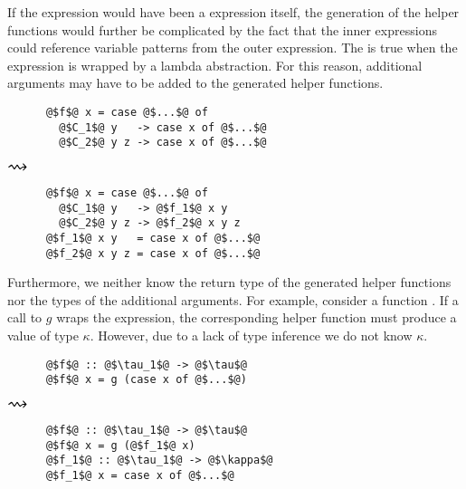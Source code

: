 If the  expression would have been a  expression itself, the generation of the helper functions would further be complicated by the fact that the inner  expressions could reference variable patterns from the outer  expression.
The is true when the  expression is wrapped by a lambda abstraction.
For this reason, additional arguments may have to be added to the generated helper functions.

\begin{center}
  \begin{minipage}[t]{0.3\textwidth}
    \begin{verbatim}
      @$f$@ x = case @$...$@ of
        @$C_1$@ y   -> case x of @$...$@
        @$C_2$@ y z -> case x of @$...$@
    \end{verbatim}
  \end{minipage}
  \begin{minipage}[c]{0.1\textwidth}
    $\mathlarger{\mathlarger{\mathlarger{\rightsquigarrow}}}$
  \end{minipage}
  \begin{minipage}[t]{0.35\textwidth}
    \begin{verbatim}
      @$f$@ x = case @$...$@ of
        @$C_1$@ y   -> @$f_1$@ x y
        @$C_2$@ y z -> @$f_2$@ x y z
      @$f_1$@ x y   = case x of @$...$@
      @$f_2$@ x y z = case x of @$...$@
    \end{verbatim}
  \end{minipage}
\end{center}

Furthermore, we neither know the return type of the generated helper functions nor the types of the additional arguments.
For example, consider a function .
If a call to $g$ wraps the  expression, the corresponding helper function must produce a value of type $\kappa$.
However, due to a lack of type inference we do not know $\kappa$.
\begin{center}
  \begin{minipage}[t]{0.3\textwidth}
    \begin{verbatim}
      @$f$@ :: @$\tau_1$@ -> @$\tau$@
      @$f$@ x = g (case x of @$...$@)
    \end{verbatim}
  \end{minipage}
  \begin{minipage}[c]{0.1\textwidth}
    $\mathlarger{\mathlarger{\mathlarger{\rightsquigarrow}}}$
  \end{minipage}
  \begin{minipage}[t]{0.35\textwidth}
    \begin{verbatim}
      @$f$@ :: @$\tau_1$@ -> @$\tau$@
      @$f$@ x = g (@$f_1$@ x)
      @$f_1$@ :: @$\tau_1$@ -> @$\kappa$@
      @$f_1$@ x = case x of @$...$@
    \end{verbatim}
  \end{minipage}
\end{center}

